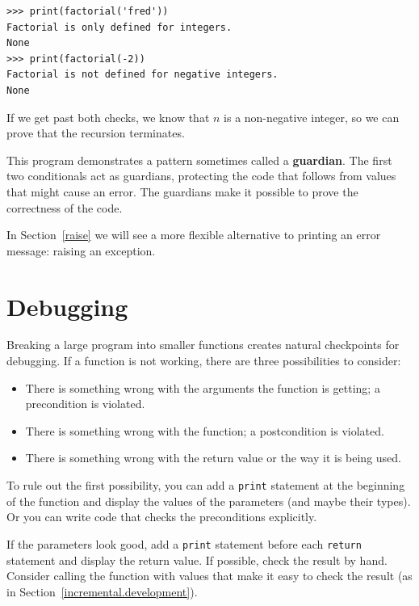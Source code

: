 \documentclass[10pt]{book}
\begin{document}
\begin{verbatim}
>>> print(factorial('fred'))
Factorial is only defined for integers.
None
>>> print(factorial(-2))
Factorial is not defined for negative integers.
None
\end{verbatim}
%
If we get past both checks, we know that $n$ is a non-negative integer, so we can prove that the recursion terminates.

This program demonstrates a pattern sometimes called a {\bf guardian}.
The first two conditionals act as guardians, protecting the code that
follows from values that might cause an error.  The guardians make it
possible to prove the correctness of the code.

In Section~\ref{raise} we will see a more flexible alternative to printing
an error message: raising an exception.


\section{Debugging}
\label{factdebug}

Breaking a large program into smaller functions creates natural
checkpoints for debugging.  If a function is not
working, there are three possibilities to consider:

\begin{itemize}

\item There is something wrong with the arguments the function
is getting; a precondition is violated.

\item There is something wrong with the function; a postcondition
is violated.

\item There is something wrong with the return value or the
way it is being used.

\end{itemize}

To rule out the first possibility, you can add a {\tt print} statement
at the beginning of the function and display the values of the
parameters (and maybe their types).  Or you can write code
that checks the preconditions explicitly.

If the parameters look good, add a {\tt print} statement before each
{\tt return} statement and display the return value.  If
possible, check the result by hand.  Consider calling the
function with values that make it easy to check the result
(as in Section~\ref{incremental.development}).
\end{document}
